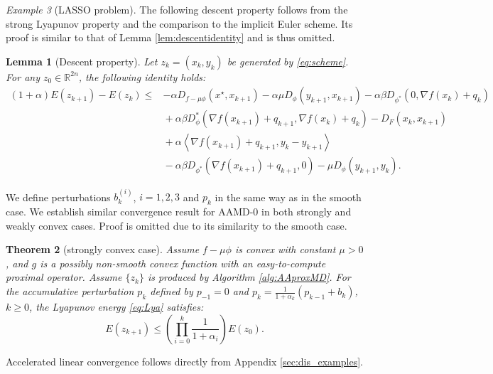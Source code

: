 \documentclass{article}
\newcommand{\dual}[1]{\left\langle {#1} \right\rangle}
\theoremstyle{plain}
\newtheorem{theorem}{Theorem}[section]
\newtheorem{lemma}[theorem]{Lemma}
\theoremstyle{definition}
\theoremstyle{remark}
\newtheorem{example}[theorem]{Example}
\begin{document}
\begin{example}[LASSO problem]
The following descent property follows from the strong Lyapunov property and the comparison to the implicit Euler scheme. Its proof is similar to that of Lemma \ref{lem:descentidentity} and is thus omitted.

\begin{lemma}[Descent property]\label{lem:descentidentity-composite}
    Let $z_k=(x_k,y_k)$ be generated by \eqref{eq:scheme}. For any $z_0\in\mathbb{R}^{2n}$, the following identity holds:
    \begin{equation}\begin{aligned}
        (1+\alpha)E(z_{k+1})-E(z_k)\leq{}& -\alpha D_{f-\mu\phi}(x^\star,x_{k+1})-\alpha\mu D_\phi(y_{k+1},x_{k+1})-\alpha\beta D_{\phi^*}(0,\nabla f(x_k)+q_k)\\&{}+\alpha\beta D_\phi^*(\nabla f(x_{k+1})+q_{k+1},\nabla f(x_k)+q_k)-D_F(x_k,x_{k+1})\\
        &{}+\alpha\dual{\nabla f(x_{k+1})+q_{k+1},y_{k}-y_{k+1}}\\
        &{}-\alpha\beta D_{\phi^*}(\nabla f(x_{k+1})+q_{k+1},0)-\mu D_\phi(y_{k+1},y_k).\end{aligned}\end{equation}
\end{lemma}

We define perturbations $b_k^{(i)}$, $i=1,2,3$ and $p_k$ in the same way as in the smooth case. We establish similar convergence result for AAMD-0 in both strongly and weakly convex cases. Proof is omitted due to its similarity to the smooth case.

\begin{theorem}[strongly convex case]\label{thm:composite-stronglyconvex}
Assume $f - \mu \phi$ is convex with constant $\mu>0$, and $g$ is a possibly non-smooth convex function with an easy-to-compute proximal operator. Assume $\{z_k\}$ is produced by Algorithm \ref{alg:AAproxMD}. For the accumulative perturbation $p_k$ defined by $p_{-1}=0$ and $p_k = \frac{1}{1+\alpha_k}(p_{k-1} + b_k)$, $k\geq 0$, the Lyapunov energy \eqref{eq:Lya} satisfies:
\begin{equation}
E(z_{k+1}) \le \left( \prod_{i=0}^k \frac{1}{1+\alpha_i} \right) E(z_0).
\end{equation}
\end{theorem}
Accelerated linear convergence follows directly from Appendix \ref{sec:dis_examples}. 


\end{example}
\end{document}
